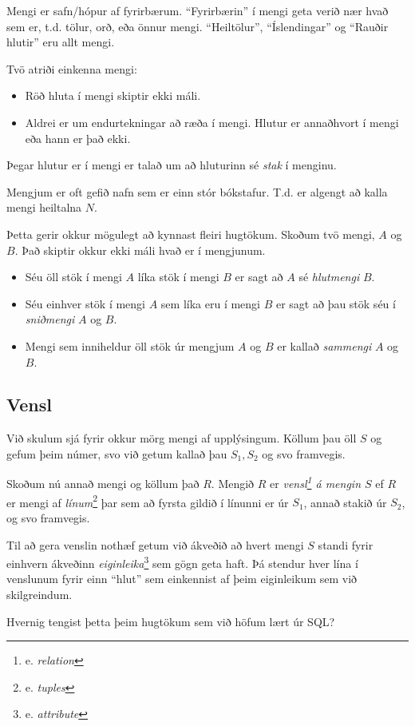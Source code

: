 Mengi er safn/hópur af fyrirbærum. ``Fyrirbærin'' í mengi geta verið nær hvað sem er, t.d. tölur, orð, eða önnur mengi. ``Heiltölur'', ``Íslendingar'' og ``Rauðir hlutir'' eru allt mengi.

Tvö atriði einkenna mengi:
\begin{itemize}
 \item Röð hluta í mengi skiptir ekki máli.
 \item Aldrei er um endurtekningar að ræða í mengi. Hlutur er annaðhvort í mengi eða hann er það ekki.
\end{itemize}
Þegar hlutur er í mengi er talað um að hluturinn sé \emph{stak} í menginu.

Mengjum er oft gefið nafn sem er einn stór bókstafur. T.d. er algengt að kalla mengi heiltalna $N$. 

Þetta gerir okkur mögulegt að kynnast fleiri hugtökum. Skoðum tvö mengi, $A$ og $B$. Það skiptir okkur ekki máli hvað er í mengjunum.
\begin{itemize}
 \item Séu öll stök í mengi $A$ líka stök í mengi $B$ er sagt að $A$ sé \emph{hlutmengi} $B$.
 \item Séu einhver stök í mengi $A$ sem líka eru í mengi $B$ er sagt að þau stök séu í \emph{sniðmengi} $A$ og $B$.
 \item Mengi sem inniheldur öll stök úr mengjum $A$ og $B$ er kallað \emph{sammengi} $A$ og $B$.
\end{itemize}


\subsection{Vensl}
Við skulum sjá fyrir okkur mörg mengi af upplýsingum. Köllum þau öll $S$ og gefum þeim númer, svo við getum kallað þau $S_1, S_2$ og svo framvegis.

Skoðum nú annað mengi og köllum það $R$. Mengið $R$ er \emph{vensl\footnote{e. \emph{relation}} á mengin $S$} ef $R$ er mengi af \emph{línum}\footnote{e. \emph{tuples}} þar sem að fyrsta gildið í línunni er úr $S_1$, annað stakið úr $S_2$, og svo framvegis.

Til að gera venslin nothæf getum við ákveðið að hvert mengi $S$ standi fyrir einhvern ákveðinn \emph{eiginleika}\footnote{e. \emph{attribute}} sem gögn geta haft. Þá stendur hver lína í venslunum fyrir einn ``hlut'' sem einkennist af þeim eiginleikum sem við skilgreindum.

Hvernig tengist þetta þeim hugtökum sem við höfum lært úr SQL?


